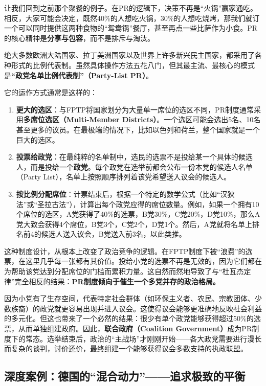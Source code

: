 让我们回到之前那个聚餐的例子。在PR的逻辑下，决策不再是“火锅”赢家通吃。相反，大家可能会决定，既然40\%的人想吃火锅，30\%的人想吃烧烤，那我们就订一个可以同时提供这两种食物的“鸳鸯锅”餐厅，甚至再点一些比萨作为小食。PR的核心精神是\textbf{分享与包容}，而不是排斥与淘汰。

绝大多数欧洲大陆国家、拉丁美洲国家以及世界上许多新兴民主国家，都采用了各种形式的比例代表制。虽然具体操作方法五花八门，但其最主流、最核心的模式是\textbf{“政党名单比例代表制”（Party-List PR）}。

它的运作方式通常是这样的：

\begin{enumerate}
    \item \textbf{更大的选区}：与FPTP将国家划分为大量单一席位的选区不同，PR制度通常采用\textbf{多席位选区（Multi-Member Districts）}。一个选区可能会选出5名、10名甚至更多的议员。在最极端的情况下，比如以色列和荷兰，整个国家就是一个巨大的选区。
    \item \textbf{投票给政党}：在最纯粹的名单制中，选民的选票不是投给某一个具体的候选人，而是投给一个\textbf{政党}。每个政党在选举前都会公布一份本党的候选人名单（Party List），名单上按照顺序排列着该党希望送入议会的候选人。
    \item \textbf{按比例分配席位}：计票结束后，根据一个特定的数学公式（比如“汉狄法”或“圣拉古法”），计算出每个政党应得的席位数量。例如，如果一个拥有10个席位的选区，A党获得了40\%的选票，B党30\%，C党20\%，D党10\%，那么A党大致会获得4个席位，B党3个，C党2个，D党1个。然后，A党就将名单上排名前4的候选人送入议会，B党送入前3名，以此类推。
\end{enumerate}

这种制度设计，从根本上改变了政治竞争的逻辑。在FPTP制度下被“浪费”的选票，在这里几乎每一张都有其价值。投给小党的选票不再是无效的，因为它们都在为帮助该党达到分配席位的门槛而累积力量。这自然而然地导致了与“杜瓦杰定律”完全相反的结果：\textbf{PR制度倾向于催生一个多党并存的政治格局。}

因为小党有了生存空间，代表特定社会群体（如环保主义者、农民、宗教团体、少数族裔）的政党就更容易出现并进入议会。这使得议会能够更准确地反映社会利益的多元化。但这也带来了一个必然的结果：很少有单个政党能够获得超过50\%的选票，从而单独组建政府。因此，\textbf{联合政府（Coalition Government）}成为PR制度下的常态。选举结束后，政治的“主战场”才刚刚开始——各大政党需要进行漫长而复杂的谈判，讨价还价，最终组建一个能够获得议会多数支持的执政联盟。

\subsection{深度案例：德国的“混合动力”——追求极致的平衡}

